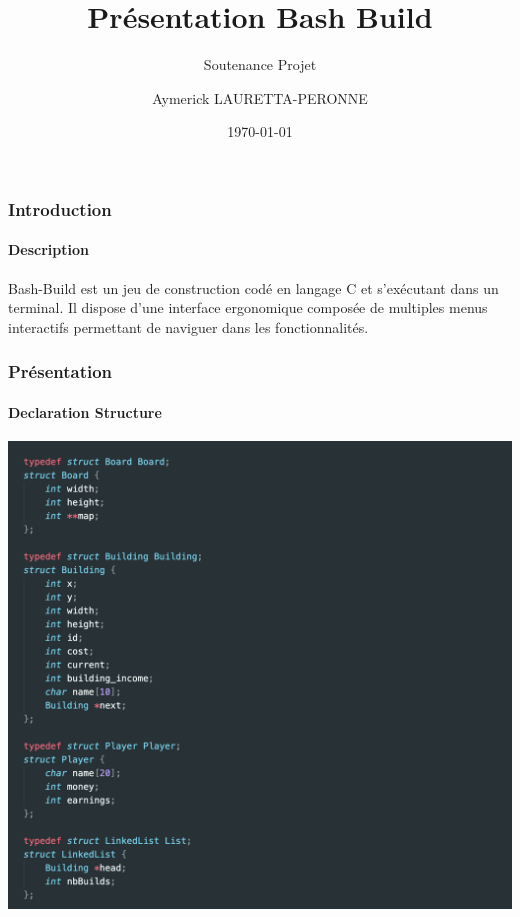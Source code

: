 \documentclass{beamer}
\begin{document}
\title{Présentation Bash Build}
\subtitle[\ldots]{Soutenance Projet}
\author[Aymerick LAURETTA-PERONNE]{Aymerick LAURETTA-PERONNE}
\date{\today}
\maketitle

\begin{frame} %
\frametitle{Introduction}
\framesubtitle{Description}

Bash-Build est un jeu de construction codé en langage C et s’exécutant dans un terminal. Il dispose d’une interface ergonomique composée de multiples menus interactifs permettant de naviguer dans les fonctionnalités.

\end{frame}

\begin{frame} %
\frametitle{Présentation}
\framesubtitle{Declaration Structure}
    \begin{center}
        \includegraphics[scale=0.28]{src/images/struct.png}
    \end{center}
\end{frame}
\end{document}
